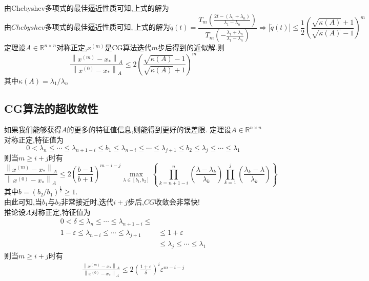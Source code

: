 \documentclass[12pt,a4paper]{article}
\begin{document}
由Chebyshev多项式的最佳逼近性质可知,上式的解为
$$由Chebyshev多项式的最佳逼近性质可知,上式的解为
\tilde{q}(t)=\frac{T_{m}\left(\frac{2 t-\left(\lambda_{1}+\lambda_{n}\right)}{\lambda_{1}-\lambda_{n}}\right)}{T_{m}\left(-\frac{\lambda_{1}+\lambda_{n}}{\lambda_{1}-\lambda_{n}}\right)} \Longrightarrow|\tilde{q}(t)| \leq \frac{1}{2}\left(\frac{\sqrt{\kappa(A)}+1}{\sqrt{\kappa(A)}-1}\right)^{m}
$$
{\color{blue}定理}\qquad 设$A \in \mathbb{R}^{n \times n}$对称正定,$x^{(m)}$是CG算法迭代$m$步后得到的近似解.则
$$
\frac{\left\|x^{(m)}-x_{*}\right\|_{A}}{\left\|x^{(0)}-x_{*}\right\|_{A}} \leq 2\left(\frac{\sqrt{\kappa(A)}-1}{\sqrt{\kappa(A)}+1}\right)^{m}
$$
其中$\kappa(A)=\lambda_{1} / \lambda_{n}$\\
\subsection*{CG算法的超收敛性}
如果我们能够获得$A$的更多的特征值信息,则能得到更好的误差限.
{\color{blue}定理}\qquad 设$A \in \mathbb{R}^{n \times n}$对称正定,特征值为
$$
0<\lambda_{n} \leq \cdots \leq \lambda_{n+1-i} \leq b_{1} \leq \lambda_{n-i} \leq \cdots \leq \lambda_{j+1} \leq b_{2} \leq \lambda_{j} \leq \cdots \leq \lambda_{1}
$$
则当$m \geq i+j$时有
$$
\frac{\left\|x^{(m)}-x_{*}\right\|_{A}}{\left\|x^{(0)}-x_{*}\right\|_{A}} \leq 2\left(\frac{b-1}{b+1}\right)^{m-i-j} \max _{\lambda \in\left[b_{1}, b_{2}\right]}\left\{\prod_{k=n+1-i}^{n}\left(\frac{\lambda-\lambda_{k}}{\lambda_{k}}\right) \prod_{k=1}^{j}\left(\frac{\lambda_{k}-\lambda}{\lambda_{k}}\right)\right\}
$$
其中$b=\left(b_{2} / b_{1}\right)^{\frac{1}{2}} \geq 1$.\\
由此可知,当$b_1$与$b_2$非常接近时,迭代$i+j$步后,$CG$收敛会非常快!\\
{\color{blue}推论}\quad 设$A$对称正定,特征值为
$$
\begin{aligned} 0<\delta \leq \lambda_{n} \leq \cdots \leq \lambda_{n+1-i} \leq \\ 1-\varepsilon \leq \lambda_{n-i} \leq \cdots \leq \lambda_{j+1} & \leq 1+\varepsilon \\ & \leq \lambda_{j} \leq \cdots \leq \lambda_{1} \end{aligned}
$$
则当$m \geq i+j$时有
\begin{align*}
\frac{\left\|x^{(m)}-x_{*}\right\|_{A}}{\left\|x^{(0)}-x_{*}\right\|_{A}} \leq 2\left(\frac{1+\varepsilon}{\delta}\right)^{i} \varepsilon^{m-i-j}
\tag{7.16}
\end{align*}
\end{document}
